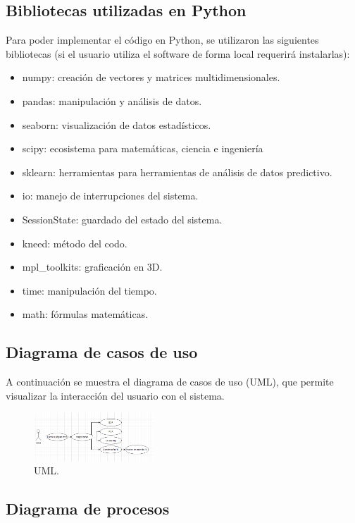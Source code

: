 \documentclass{article}
\begin{document}
\subsection{Bibliotecas utilizadas en Python}
Para poder implementar el código en Python, se utilizaron las siguientes bibliotecas (si el usuario utiliza el software de forma local requerirá instalarlas):
\begin{itemize}
	\item numpy: creación de vectores y matrices multidimensionales.
	\item pandas: manipulación y análisis de datos.
	\item seaborn: visualización de datos estadísticos. 
	\item scipy: ecosistema para matemáticas, ciencia  e ingeniería
	\item sklearn: herramientas para herramientas de análisis de datos predictivo.
	\item io: manejo de interrupciones del sistema.
	\item SessionState: guardado del estado del sistema.
	\item kneed: método del codo.
	\item mpl\_toolkits: graficación en 3D.
	\item time: manipulación del tiempo.
	\item math: fórmulas matemáticas.
\end{itemize}

\subsection{Diagrama de casos de uso}

A continuación se muestra el diagrama de casos de uso (UML), que permite visualizar la interacción del usuario con
el sistema.

\begin{figure}[!htb]
	\centering
	\includegraphics[width=0.4\textwidth]{figures/UML.png}
	\caption{UML.}
	\label{fig:UML}
\end{figure}

\subsection{Diagrama de procesos}
\end{document}
